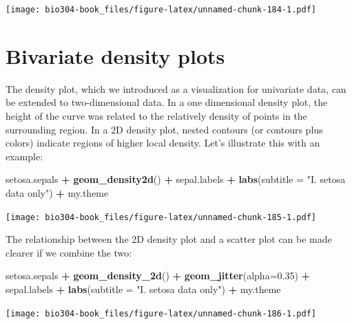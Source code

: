 \documentclass[]{book}
\newenvironment{Shaded}{\begin{snugshade}}{\end{snugshade}}
\newcommand{\DataTypeTok}[1]{\textcolor[rgb]{0.13,0.29,0.53}{#1}}
\newcommand{\FloatTok}[1]{\textcolor[rgb]{0.00,0.00,0.81}{#1}}
\newcommand{\KeywordTok}[1]{\textcolor[rgb]{0.13,0.29,0.53}{\textbf{#1}}}
\newcommand{\NormalTok}[1]{#1}
\newcommand{\OperatorTok}[1]{\textcolor[rgb]{0.81,0.36,0.00}{\textbf{#1}}}
\newcommand{\StringTok}[1]{\textcolor[rgb]{0.31,0.60,0.02}{#1}}
\theoremstyle{definition}
\theoremstyle{definition}
\theoremstyle{definition}
\theoremstyle{remark}
\begin{document}
\texttt{[image: bio304-book\_files/figure-latex/unnamed-chunk-184-1.pdf]}

\hypertarget{bivariate-density-plots}{%
\section{Bivariate density plots}\label{bivariate-density-plots}}

The density plot, which we introduced as a visualization for univariate
data, can be extended to two-dimensional data. In a one dimensional
density plot, the height of the curve was related to the relatively
density of points in the surrounding region. In a 2D density plot,
nested contours (or contours plus colors) indicate regions of higher
local density. Let's illustrate this with an example:

\begin{Shaded}
\begin{Highlighting}[]
\NormalTok{setosa.sepals }\OperatorTok{+}\StringTok{ }
\StringTok{  }\KeywordTok{geom_density2d}\NormalTok{() }\OperatorTok{+}\StringTok{ }
\StringTok{  }\NormalTok{sepal.labels }\OperatorTok{+}\StringTok{ }\KeywordTok{labs}\NormalTok{(}\DataTypeTok{subtitle =} \StringTok{"I. setosa data only"}\NormalTok{) }\OperatorTok{+}
\StringTok{  }\NormalTok{my.theme}
\end{Highlighting}
\end{Shaded}

\texttt{[image: bio304-book\_files/figure-latex/unnamed-chunk-185-1.pdf]}

The relationship between the 2D density plot and a scatter plot can be
made clearer if we combine the two:

\begin{Shaded}
\begin{Highlighting}[]
\NormalTok{setosa.sepals }\OperatorTok{+}\StringTok{ }
\StringTok{  }\KeywordTok{geom_density_2d}\NormalTok{() }\OperatorTok{+}\StringTok{ }
\StringTok{  }\KeywordTok{geom_jitter}\NormalTok{(}\DataTypeTok{alpha=}\FloatTok{0.35}\NormalTok{) }\OperatorTok{+}
\StringTok{  }\NormalTok{sepal.labels }\OperatorTok{+}\StringTok{ }\KeywordTok{labs}\NormalTok{(}\DataTypeTok{subtitle =} \StringTok{"I. setosa data only"}\NormalTok{) }\OperatorTok{+}
\StringTok{  }\NormalTok{my.theme}
\end{Highlighting}
\end{Shaded}

\texttt{[image: bio304-book\_files/figure-latex/unnamed-chunk-186-1.pdf]}
\end{document}
